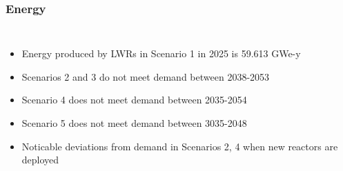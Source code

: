 \begin{frame}
    \frametitle{Energy}
    \begin{columns}
        \column[t]{5cm}
        \begin{itemize}
            \item Energy produced by \glspl{LWR} in Scenario 1 in 2025 is 59.613 GWe-y
            \item Scenarios 2 and 3 do not meet demand between 2038-2053
            \item Scenario 4 does not meet demand between 2035-2054
            \item Scenario 5 does not meet demand between 3035-2048
            \item Noticable deviations from demand in Scenarios 2, 4 when new 
                  reactors are deployed
        \end{itemize}


\end{columns}
\end{frame}
